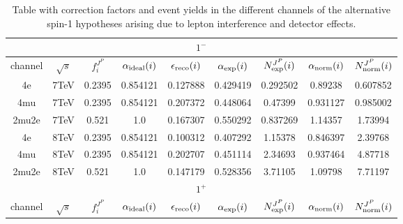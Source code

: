 \begin{table}[b]
\centering
\caption{
Table with correction factors and event yields in the different
channels of the alternative spin-1 hypotheses arising
due to lepton interference and detector effects.}
\centering %
\begin{tabular}{c c c c c c c c c} %
\hline \hline
 \multicolumn{9}{|c|}{$1^{-}$} \\ \hline 
channel & $\sqrt{s}$ & $f_{i}^{J^P}$ & $\alpha_{\rm ideal} (i)$ & $\epsilon_{\rm reco} (i)$ & $\alpha_{\rm exp} (i)$ & $N^{J^P}_{\rm exp} (i)$ & $\alpha_{\rm norm} (i)$ & $N^{J^P}_{\rm norm} (i)$\\ \hline 
4e & 7TeV & 0.2395 & 0.854121 & 0.127888 & 0.429419
 & 0.292502%
 & 0.89238 & 0.607852 \\ \hline 4mu & 7TeV & 0.2395 & 0.854121 & 0.207372 & 0.448064
 & 0.47399%
 & 0.931127 & 0.985002 \\ \hline 2mu2e & 7TeV & 0.521 & 1.0  & 0.167307 & 0.550292
 & 0.837269%
 & 1.14357 & 1.73994 \\ \hline \hline 
4e & 8TeV & 0.2395 & 0.854121 & 0.100312 & 0.407292
 & 1.15378%
 & 0.846397 & 2.39768 \\ \hline 4mu & 8TeV & 0.2395 & 0.854121 & 0.202707 & 0.451114
 & 2.34693%
 & 0.937464 & 4.87718 \\ \hline 2mu2e & 8TeV & 0.521 & 1.0  & 0.147179 & 0.528356
 & 3.71105%
 & 1.09798 & 7.71197 \\ \hline \hline 
 \multicolumn{9}{|c|}{$1^{+}$} \\ \hline 
channel & $\sqrt{s}$ & $f_{i}^{J^P}$ & $\alpha_{\rm ideal} (i)$ & $\epsilon_{\rm reco} (i)$ & $\alpha_{\rm exp} (i)$ & $N^{J^P}_{\rm exp} (i)$ & $\alpha_{\rm norm} (i)$ & $N^{J^P}_{\rm norm} (i)$\\ \hline 

\end{tabular}
\end{table}
